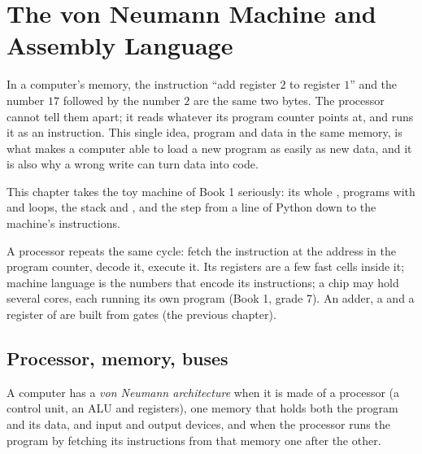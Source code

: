 \chapter{The von Neumann Machine and Assembly Language}\label{ch:g11:von-neumann-machine}

In a computer's memory, the instruction ``add register $2$ to register $1$'' and the number $17$ followed by the
number $2$ are the same two bytes. The processor cannot tell them apart; it reads whatever its program counter
points at, and runs it as an instruction. This single idea, program and data in the same memory, is what makes a
computer able to load a new program as easily as new data, and it is also why a wrong write can turn data into
code.

This chapter takes the toy machine of Book 1 seriously: its whole , programs with  and loops, the
stack and , and the step from a line of Python down to the machine's instructions.

\begin{recall}
A processor repeats the same cycle: fetch the instruction at the address in the program counter, decode it, execute
it. Its registers are a few fast cells inside it; machine language is the numbers that encode its instructions; a
chip may hold several cores, each running its own program (Book 1, grade 7). An adder, a  and a register of
 are built from gates (the previous chapter).
\end{recall}

\section{Processor, memory, buses}\label{sec:g11:von-neumann-machine:model}

\begin{definition}\label{def:g11:von-neumann-machine:von-neumann}
A computer has a \emph{von Neumann architecture} when it is made of a processor (a
control unit, an ALU and registers), one memory that holds both the program and its data, and input and output
devices, and when the processor runs the program by fetching its instructions from that memory one after the other.
\end{definition}

